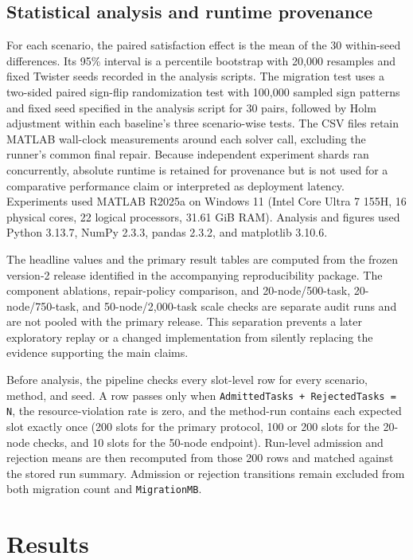 \documentclass[preprint,12pt]{elsarticle}
\begin{document}
\subsection{Statistical analysis and runtime provenance}\label{statistical-analysis-and-runtime-provenance}

For each scenario, the paired satisfaction effect is the mean of the 30
within-seed differences. Its 95\% interval is a percentile bootstrap
with 20,000 resamples and fixed Twister seeds recorded in the analysis
scripts. The migration test uses a two-sided paired sign-flip
randomization test with 100,000 sampled sign patterns and fixed seed
specified in the analysis script for 30 pairs, followed by Holm adjustment
within each baseline's three scenario-wise tests. The CSV files retain
MATLAB wall-clock measurements around each solver call, excluding the
runner's common final repair. Because independent experiment shards ran
concurrently, absolute runtime is retained for provenance but is not used
for a comparative performance claim or interpreted as deployment latency.
Experiments used MATLAB R2025a on Windows 11 (Intel Core Ultra 7 155H,
16 physical cores, 22 logical processors, 31.61 GiB RAM). Analysis and
figures used Python 3.13.7, NumPy 2.3.3, pandas 2.3.2, and matplotlib
3.10.6.

The headline values and the primary result tables are computed from the
frozen version-2 release identified in the accompanying reproducibility
package. The component ablations, repair-policy comparison, and 20-node/500-task,
20-node/750-task, and 50-node/2,000-task scale checks are separate audit runs
and are not pooled with the primary release. This separation prevents a later exploratory replay or a
changed implementation from silently replacing the evidence supporting the
main claims.

Before analysis, the pipeline checks every slot-level row for every
scenario, method, and seed. A row passes only when
\texttt{AdmittedTasks + RejectedTasks = N}, the resource-violation rate is
zero, and the method-run contains each expected slot exactly once (200 slots
for the primary protocol, 100 or 200 slots for the 20-node checks, and
10 slots for the 50-node endpoint). Run-level
admission and rejection means are then recomputed from those 200 rows and
matched against the stored run summary. Admission or rejection transitions
remain excluded from both migration count and \texttt{MigrationMB}.

\section{Results}\label{results}
\end{document}
